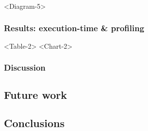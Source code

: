 <Diagram-5>

% 
\subsubsection{Results: execution-time \& profiling}

<Table-2>
<Chart-2>

% 
\subsubsection*{Discussion}

\subsection{Future work}

\subsection{Conclusions}
